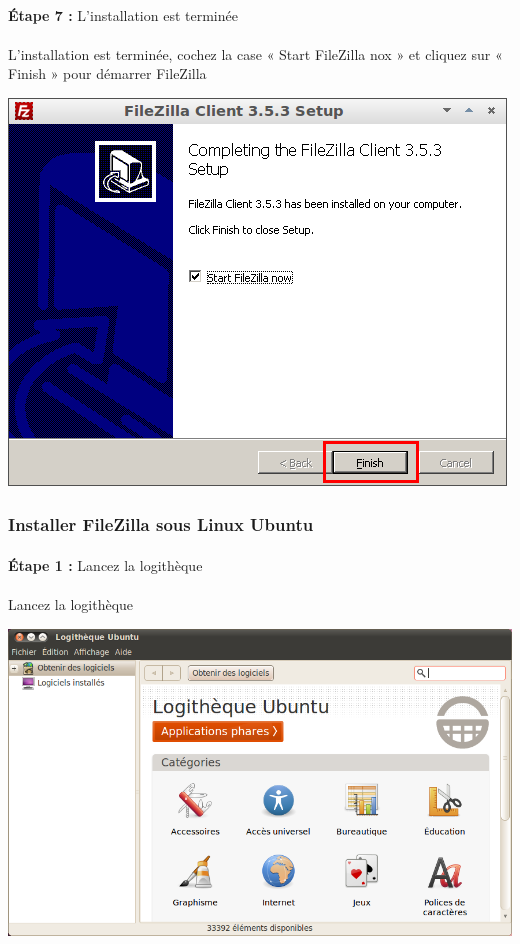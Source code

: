 \documentclass[10pt,a4paper]{article}
\begin{document}
\paragraph{}\textbf{Étape 7 : }L'installation est terminée
\paragraph{}L'installation est terminée, cochez la case « Start FileZilla nox » et cliquez sur « Finish » pour démarrer FileZilla
\begin{center}
\includegraphics[scale=0.5]{img/0022.png}
\end{center}
\subsubsection{Installer FileZilla sous Linux Ubuntu}
\paragraph{}\textbf{Étape 1 : }Lancez la logithèque
\paragraph{}Lancez la logithèque
\begin{center}
\includegraphics[scale=0.4]{img/0023.png}
\end{center}
\end{document}
